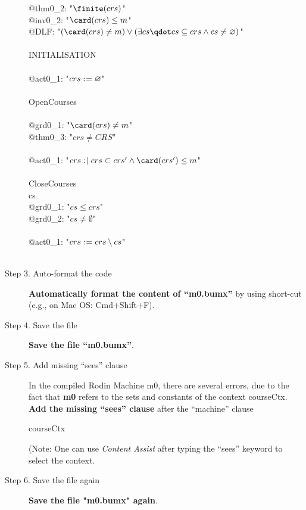 \begin{description}
\begin{center}
\begin{Bcode}
      \Btab @thm0\_2: "\(\finite(crs)\)" \Btheorem \\
      \Btab @inv0\_2: "\(\card(crs) \leq m\)" \\
      \Btab @DLF: "\((\card(crs) \neq m) \lor (\exists cs \qdot cs \subseteq crs \land cs \neq \emptyset)\)" \\
      \Bevents\\
      \Btab INITIALISATION\\
      \Btab \Bbegin \\
      \Btab\Btab @act0\_1: "\(crs \mathrel{:\mkern1mu=} \mathord\varnothing\)"\\
      \Btab \Bend\\
      \Btab OpenCourses\\
      \Btab \Bwhen\\
      \Btab \Btab @grd0\_1: "\(\card(crs) \neq m\)" \\
      \Btab \Btab @thm0\_3: "\(crs \neq CRS\)" \Btheorem \\
      \Btab \Bthen\\
      \Btab \Btab @act0\_1: "\(crs \bcmsuch crs \subset crs' \land \card(crs') \leq m\)"\\
      \Btab \Bend\\
      \Btab CloseCourses \Banticipated\\
      \Btab \Bany{} cs \Bwhere\\
      \Btab \Btab @grd0\_1: "\(cs \leq crs\)"\\
      \Btab \Btab @grd0\_2: "\(cs \neq \emptyset\)"\\
      \Btab \Bthen\\
      \Btab \Btab @act0\_1: "\(crs \mathrel{:\mkern1mu=} crs \setminus cs\)"\\
      \Btab \Bend\\
      \Bend
      \fi
    \end{Bcode}
  \end{center}
\item[Step 3. Auto-format the code] \textbf{Automatically format the content of ``m0.bumx''} by using short-cut (e.g., on Mac OS: Cmd+Shift+F).

\item[Step 4. Save the file] \textbf{Save the file ``m0.bumx''}.

\item[Step 5. Add missing ``sees'' clause] In the compiled Rodin Machine m0, there are several errors, due to the fact that \textbf{m0} refers to the sets and constants of the context courseCtx.
  \textbf{Add the missing ``sees'' clause} after the ``machine'' clause
  \begin{center}
    \begin{Bcode}
      \Bsees{} courseCtx
    \end{Bcode}
  \end{center}
  (Note: One can use \emph{Content Assist} after typing the ``sees'' keyword to select the context.
  
\item[Step 6. Save the file again] \textbf{Save the file "m0.bumx" again}.
\end{description}
